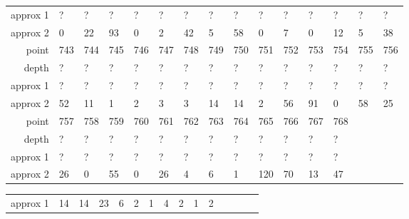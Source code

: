 \begin{center}
\begin{supertabular}{|r|l l l l l l l l l l l l l l|}
approx 1 & ? & ? & ? & ? & ? & ? & ? & ? & ? & ? & ? & ? & ? & ? \\
approx 2 & 0 & 22 & 93 & 0 & 2 & 42 & 5 & 58 & 0 & 7 & 0 & 12 & 5 & 38 \\
\hline
point & 743 & 744 & 745 & 746 & 747 & 748 & 749 & 750 & 751 & 752 & 753 & 754 & 755 & 756 \\
\hline
depth & ? & ? & ? & ? & ? & ? & ? & ? & ? & ? & ? & ? & ? & ? \\
approx 1 & ? & ? & ? & ? & ? & ? & ? & ? & ? & ? & ? & ? & ? & ? \\
approx 2 & 52 & 11 & 1 & 2 & 3 & 3 & 14 & 14 & 2 & 56 & 91 & 0 & 58 & 25 \\
\hline
point & 757 & 758 & 759 & 760 & 761 & 762 & 763 & 764 & 765 & 766 & 767 & 768 & & \\
\hline
depth & ? & ? & ? & ? & ? & ? & ? & ? & ? & ? & ? & ? & & \\
approx 1 & ? & ? & ? & ? & ? & ? & ? & ? & ? & ? & ? & ? & & \\
approx 2 & 26 & 0 & 55 & 0 & 26 & 4 & 6 & 1 & 120 & 70 & 13 & 47 & & \\
\hline
  \end{supertabular}
  \label{tab:test.pima5d}
\end{center}

\begin{center}
  \tablefirsthead{\hline}
  \tablelasttail{\hline}
  \begin{supertabular}{|r|l l l l l l l l l l l l l l|}

approx 1 & 14 & 14 & 23 & 6 & 2 & 1 & 4 & 2 & 1 & 2 & & & & \\
  \end{supertabular}
  \label{tab:test.yeast}
\end{center}
